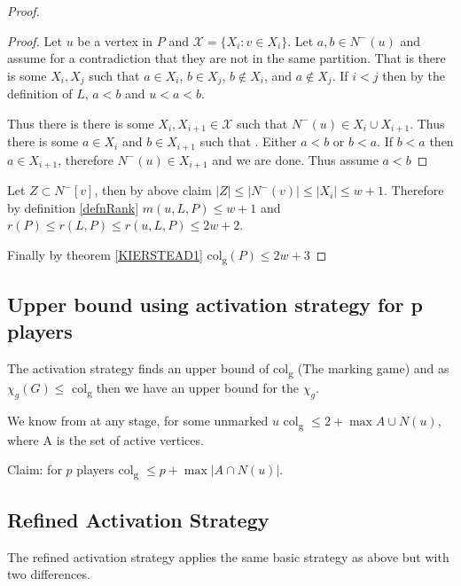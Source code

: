 \begin{proof}
\begin{proof}
        Let $u$ be a vertex in $P$ and $\mathcal{X} = \{X_i:v \in X_i\}$. Let $a,b \in N^-(u)$ and assume for a contradiction that they are not in the same partition. That is there is some $X_i,X_j$ such that $a \in X_i$, $b \in X_j$, $b \notin X_i$, and $a \notin X_j$. If $i<j$ then by the definition of $L$, $a<b$ and $u<a<b$.  
        
        Thus there is there is some $X_i,X_{i+1} \in \mathcal{X}$ such that $N^-(u) \in X_i\cup X_{i+1}$. Thus there is some $a \in X_i$ and $b \in X_{i+1}$ such that . Either $a<b$ or $b<a$. If $b<a$ then $a\in X_{i+1}$, therefore $N^-(u) \in X_{i+1}$ and we are done. Thus assume $a<b$ 
    \end{proof}
    
    Let $Z\subset N^-[v]$, then by above claim $\left| Z\right| \leq \left| N^-(v)\right| \leq |X_i| \leq w+1$. Therefore by definition \ref{defnRank} $m(u,L,P) \leq w+1$ and $r(P) \leq r(L,P) \leq r(u,L,P) \leq 2w+2$. 
    
    Finally by theorem \ref{KIERSTEAD1} col\textsubscript{g}$(P) \leq 2w + 3$
    
\end{proof}

\subsection{Upper bound using activation strategy for p players}

The activation strategy finds an upper bound of col\textsubscript{g} (The marking game) and as $\chi_g(G) \leq$ col\textsubscript{g} then we have an upper bound for the $\chi_g$. 

We know from \cite{Zhu2008} at any stage, for some unmarked $u$ col\textsubscript{g} $\leq 2 + \max{A \cup N(u)}$, where A is the set of active vertices.

Claim: for $p$ players col\textsubscript{g} $\leq p + \max{ \left| A \cap N(u)\right| }$. 

\subsection{Refined Activation Strategy}
The refined activation strategy applies the same basic strategy as above but with two differences. 

